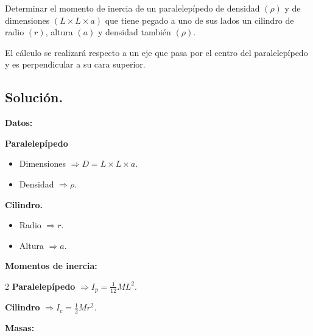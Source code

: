 \documentclass[a4paper,12pt]{article} %
\begin{document}
\begin{justify}
    Determinar el momento de inercia de un paralelepípedo de densidad \((\rho)\)
    y de dimensiones \(( L \times L \times a )\) que tiene pegado a uno de sus lados un cilindro de radio \((r)\), altura
    \((a)\) y densidad también \((\rho)\).
\end{justify}

\begin{justify}
    El cálculo se realizará respecto a un eje que pasa por el centro del
    paralelepípedo y es perpendicular a su cara superior.
\end{justify}

\subsection{Solución.}

\textbf{Datos:}

\vspace{\baselineskip}

\textbf{Paralelepípedo}

\begin{itemize}
    \item Dimensiones \(\Rightarrow D = L \times L \times a.\)
    \item Densidad \(\Rightarrow \rho .\)
\end{itemize}

\vspace{\baselineskip}

\textbf{Cilindro.}

\begin{itemize}
    \item Radio \(\Rightarrow r.\)
    \item Altura \(\Rightarrow a.\)
\end{itemize}

\begin{justify}
    \textbf{Momentos de inercia:}
\end{justify}

\begin{multicols}{2}
    \textbf{Paralelepípedo} \( \Rightarrow I_p = \frac{1}{12}ML^2.\)
    
    \textbf{Cilindro} \(\Rightarrow I_c = \frac{1}{2}Mr^2.\)
\end{multicols}

\begin{justify}
    \textbf{Masas:}
\end{justify}
\end{document}
